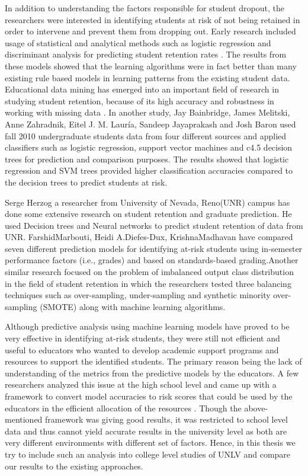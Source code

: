 \documentclass[11pt,openright]{report}
\begin{document}
In addition to understanding the factors responsible for student dropout, the researchers were interested in identifying students at risk of not being retained in order to intervene and prevent them from dropping out. Early research included usage of statistical and analytical methods such as logistic regression and discriminant analysis for predicting student retention rates \cite{lakkaraju2015machine,marbouti2016models,adejo2017}. The results from these models showed that the learning algorithms were in fact better than many existing rule based models in learning patterns from the existing student data. Educational data mining has emerged into an important field of research in studying student retention, because of its high accuracy and robustness in working with missing data \cite{alkhasawneh2014developing}. In another study, Jay Bainbridge, James Melitski, Anne Zahradnik, Eitel J. M. Lauría, Sandeep Jayaprakash and Josh Baron used fall 2010 undergraduate students data from four different sources and applied classifiers such as logistic regression, support vector machines and c4.5 decision trees for prediction and comparison purposes\cite{bainbridge2015}. The results showed that logistic regression and SVM trees provided higher classification accuracies compared to the decision trees to predict students at risk. 

Serge Herzog a researcher from University of Nevada, Reno(UNR) campus has done some extensive research on student retention and graduate prediction. He used Decision trees and Neural networks to predict student retention of data from UNR\cite{herzog2006estimating}. FarshidMarbouti, Heidi A.Diefes-Dux, KrishnaMadhavan \cite{marbouti2016models} have compared seven different prediction models for identifying at-risk students using in-semester performance factors (i.e., grades) and based on standards-based grading.Another similar research focused on the problem of imbalanced output class distribution in the field of student retention in which the researchers tested three balancing techniques such as over-sampling, under-sampling and synthetic minority over-sampling (SMOTE) along with machine learning algorithms.

Although predictive analysis using machine learning models have proved to be very effective in identifying at-risk students, they were still not efficient and useful to educators who wanted to develop academic support programs and resources to support the identified students. The primary reason being the lack of understanding of the metrics from the predictive models by the educators. A few researchers analyzed this issue at the high school level and came up with a framework to convert model accuracies to risk scores that could be used by the educators in the efficient allocation of the resources \cite{lakkaraju2015machine}. Though the above-mentioned framework was giving good results, it was restricted to school level data and thus cannot yield accurate results in the university level as both are very different environments with different set of factors. Hence, in this thesis we try to include such an analysis into college level studies of UNLV and compare our results to the existing approaches.
\end{document}
